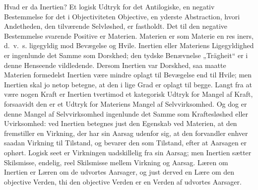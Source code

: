 \documentclass[12pt]{book}
\begin{document}
Hvad er da Inertien? Et logisk Udtryk for det Antilogiske, en negativ Bestemmelse for det
i Objectiviteten Objective, en yderste Abstraction, hvori Andetheden, den tilværende
Selvløshed, er fastholdt. Det til den negative Bestemmelse svarende Positive er Materien.
Materien er som Materie en res iners, d.\ v.\ s. ligegyldig mod Bevægelse og Hvile.
Inertien eller Materiens Ligegyldighed er ingenlunde det Samme som Dorskhed; den tydske
Benævnelse „Trägheit“ er i denne Henseende vildledende. Dersom Inertien var Dorskhed,
saa maatte Materien formedelst Inertien være mindre oplagt til Bevægelse end til Hvile;
men Inertien skal jo netop betegne, at den i lige Grad er oplagt til begge. Langt fra at
være nogen Kraft er Inertien tvertimod et kategorisk Udtryk for Mangel af Kraft,
forsaavidt den er et Udtryk for Materiens Mangel af Selvvirksomhed. Og dog er denne
Mangel af Selvvirksomhed ingenlunde det Samme som Kraftesløshed eller Uvirksomhed: ved
Inertien betegnes just den Egenskab ved Materien, at den fremstiller en Virkning, der har
sin Aarsag udenfor sig, at den forvandler enhver saadan Virkning til Tilstand, og bevarer
den som Tilstand, efter at Aarsagen er ophørt. Logisk seet er Virkningen uadskillelig fra
sin Aarsag; men Inertien sætter Skilsmisse, endelig, reel Skilsmisse mellem Virkning og
Aarsag. Læren om Inertien er Læren om de udvortes Aarsager, og just derved en Lære om den
objective Verden, thi den objective Verden er en Verden af udvortes Aarsager.
\end{document}

